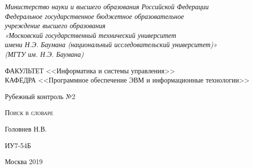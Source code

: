 \documentclass[a4paper,12pt]{article}
\begin{document}

\begin{titlepage}
\newpage

\begin{center}

\textit{Министерство науки и высшего образования Российской Федерации \\ 
Федеральное государственное бюджетное образовательное \\
учреждение высшего образования \\
«Московский государственный технический университет \\
имени Н.Э. Баумана (национальный исследовательский университет)» \\
(МГТУ им. Н.Э. Баумана) \\}
\hrulefill
\end{center}

\vspace{2em}

\begin{flushleft}
ФАКУЛЬТЕТ <<Информатика и системы управления>> \\
\vspace{0.5em}
КАФЕДРА <<Программное обеспечение ЭВМ и информационные технологии>>
\end{flushleft}


\vspace{8em}

\begin{center}
\LARGE Рубежный контроль №2 \\
\end{center}

\vspace{1.5em}

\begin{center}
\textsc{Поиск в словаре}
\end{center}

\vspace{6em}

\begin{center}
Головнев Н.В.

\vspace{4em}

ИУ7-54Б
\end{center}

\vspace{\fill}

\begin{center}
Москва 2019
\end{center}

\end{titlepage}
\end{document}
